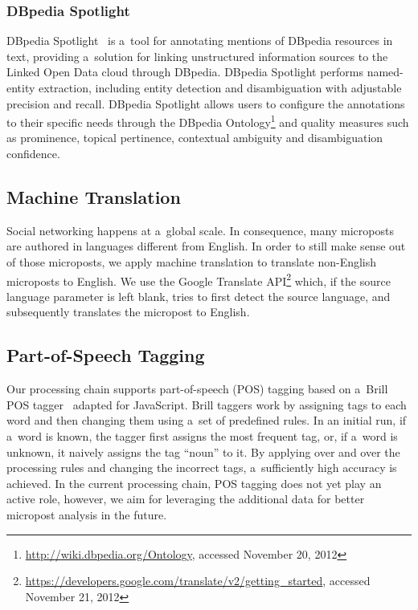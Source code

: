 \subsubsection{DBpedia Spotlight}

DBpedia Spotlight~\cite{mendes2011dbpediaspotlight}
is a~tool for annotating mentions of DBpedia resources in text,
providing a~solution for linking unstructured information sources
to the Linked Open Data cloud through DBpedia.
DBpedia Spotlight performs named-entity extraction,
including entity detection and disambiguation
with adjustable precision and recall.
DBpedia Spotlight allows users to configure the annotations
to their specific needs through the DBpedia
Ontology\footnote{\url{http://wiki.dbpedia.org/Ontology},
accessed November 20, 2012}
and quality measures such as prominence, topical pertinence,
contextual ambiguity and disambiguation confidence.

\subsection{Machine Translation}
\label{sec:machine-translation}

Social networking happens at a~global scale.
In consequence, many microposts are authored
in languages different from English.
In order to still make sense out of those microposts,
we apply machine translation to translate non-English microposts
to English.
We use the Google Translate
API\footnote{\url{https://developers.google.com/translate/v2/getting_started},
accessed November 21, 2012}
which, if the source language parameter is left blank,
tries to first detect the source language,
and subsequently translates the micropost to English.

\subsection{Part-of-Speech Tagging}
\label{sec:part-of-speech-tagging}

Our processing chain supports part-of-speech (POS) tagging
based on a~Brill POS tagger~\cite{brill1992pos} adapted for JavaScript.
Brill taggers work by assigning tags to each word and then changing them
using a~set of predefined rules.
In an initial run, if a~word is known, the tagger
first assigns the most frequent tag,
or, if a~word is unknown, it naively assigns the tag ``noun'' to it.
By applying over and over the processing rules and
changing the incorrect tags, a~sufficiently high accuracy is achieved.
In the current processing chain, POS tagging does not yet
play an active role,
however, we aim for leveraging the additional data
for better micropost analysis in the future.

